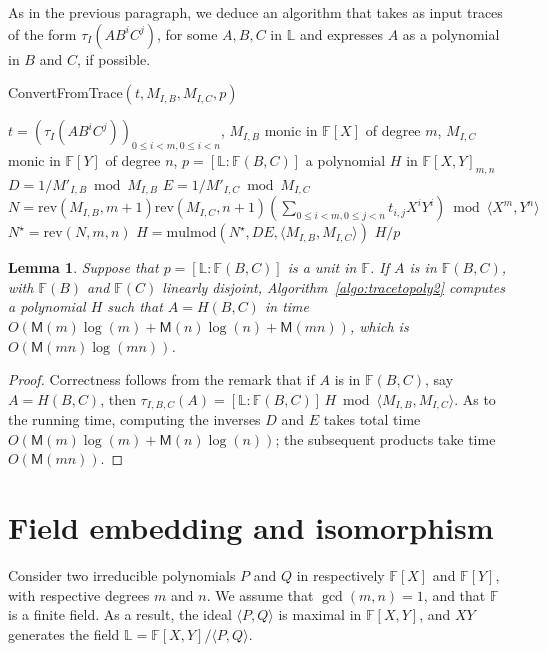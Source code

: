 \documentclass[12pt]{article}
\def\M {\ensuremath{\mathsf{M}}}
\def\F {\ensuremath{\mathbb{F}}}
\def\L {\ensuremath{\mathbb{L}}}
\def\mulmod {\ensuremath{\mathrm{mulmod}}}
\def\rev {\ensuremath{\mathrm{rev}}}
\newtheorem{Lemma}{Lemma}
\begin{document}
As in the previous paragraph, we deduce an algorithm that takes as
input traces of the form $\tau_I(A B^i C^j)$, for some $A,B,C$ in $\L$
and expresses $A$ as a polynomial in $B$ and $C$, if possible.
\begin{algorithm}[H]
  \caption{ConvertFromTrace$(t, M_{I,B}, M_{I,C}, p)$}
  \begin{algorithmic}[1]
    \REQUIRE  $t=(\tau_I(A B^iC^j))_{0 \le i < m, 0 \le i < n}$, $M_{I,B}$ monic in $\F[X]$ of degree $m$,
    $M_{I,C}$ monic in $\F[Y]$ of degree $n$, 
    $p=[\L:\F(B,C)]$
    \ENSURE a polynomial $H$ in $\F[X,Y]_{m,n}$
    \STATE $D =  1/M'_{I,B} \bmod M_{I,B}$
    \STATE $E =  1/M'_{I,C} \bmod M_{I,C}$
    \STATE $N=\rev(M_{I,B}, m+1)\rev(M_{I,C}, n+1)( \sum_{0 \le i <m, 0 \le j < n} t_{i,j} X^iY^i) \bmod \langle X^m, Y^n \rangle$
    \STATE $N^\star = \rev(N, m, n)$
    \STATE $H=\mulmod(N^\star, D E, \langle M_{I,B}, M_{I,C} \rangle)$
    \RETURN $H/p$
  \end{algorithmic}
  \label{algo:tracetopoly2}
\end{algorithm}

\begin{Lemma}
  Suppose that $p=[\L:\F(B,C)]$ is a unit in $\F$. If $A$ is in
  $\F(B,C)$, with $\F(B)$ and $\F(C)$ linearly disjoint,
  Algorithm~\ref{algo:tracetopoly2} computes a polynomial $H$ such
  that $A=H(B,C)$ in time $O(\M(m)\log(m)+\M(n)\log(n)+\M(mn))$, which
  is $O(\M(mn)\log(mn))$.
\end{Lemma}
\begin{proof}
  Correctness follows from the remark that if $A$ is in $\F(B,C)$, say
  $A=H(B,C)$, then $\tau_{I,B,C} (A)=[\L:\F(B,C)]\, H \bmod \langle
  M_{I,B}, M_{I,C} \rangle$.  As to the running time, computing
  the inverses $D$ and $E$ takes total time $O(\M(m)\log(m)+\M(n)\log(n))$;
  the subsequent products take time $O(\M(mn))$.
\end{proof}


\section{Field embedding and isomorphism} 

Consider two irreducible polynomials $P$ and $Q$ in respectively
$\F[X]$ and $\F[Y]$, with respective degrees $m$ and $n$. We assume
that $\gcd(m,n)=1$, and that $\F$ is a finite field. As a result, the
ideal $\langle P, Q\rangle$ is maximal in $\F[X,Y]$, and $XY$
generates the field $\L=\F[X,Y]/\langle P, Q \rangle$.
\end{document}

